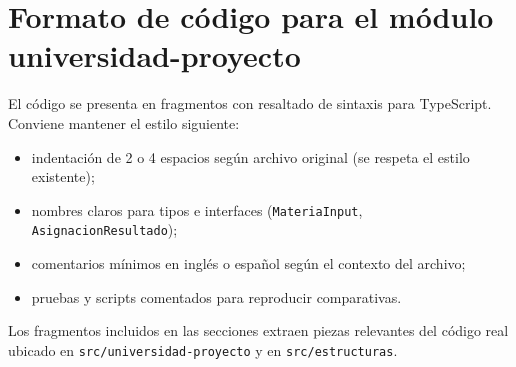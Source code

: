 \chapter{Formato de código para el módulo universidad-proyecto}

El código se presenta en fragmentos con resaltado de sintaxis para TypeScript. Conviene mantener el estilo siguiente:

\begin{itemize}[leftmargin=1.5cm]
  \item indentación de 2 o 4 espacios según archivo original (se respeta el estilo existente);
  \item nombres claros para tipos e interfaces (\texttt{MateriaInput}, \texttt{AsignacionResultado});
  \item comentarios mínimos en inglés o español según el contexto del archivo;
  \item pruebas y scripts comentados para reproducir comparativas.
\end{itemize}

Los fragmentos incluidos en las secciones extraen piezas relevantes del código real ubicado en \texttt{src/universidad-proyecto} y en \texttt{src/estructuras}.
